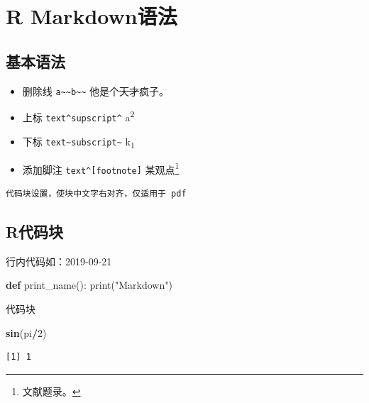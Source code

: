 \documentclass[]{article}
\newenvironment{Shaded}{\begin{snugshade}}{\end{snugshade}}
\newcommand{\BuiltInTok}[1]{#1}
\newcommand{\DecValTok}[1]{\textcolor[rgb]{0.00,0.00,0.81}{#1}}
\newcommand{\KeywordTok}[1]{\textcolor[rgb]{0.13,0.29,0.53}{\textbf{#1}}}
\newcommand{\NormalTok}[1]{#1}
\newcommand{\OperatorTok}[1]{\textcolor[rgb]{0.81,0.36,0.00}{\textbf{#1}}}
\newcommand{\StringTok}[1]{\textcolor[rgb]{0.31,0.60,0.02}{#1}}
\providecommand{\tightlist}{%
  \setlength{\itemsep}{0pt}\setlength{\parskip}{0pt}}
\let\rmarkdownfootnote\footnote%
\def\footnote{\protect\rmarkdownfootnote}
\begin{document}
\hypertarget{Rmarkdown}{%
\section{R Markdown语法}\label{Rmarkdown}}

\hypertarget{section-22}{%
\subsection{基本语法}\label{section-22}}

\begin{itemize}
\tightlist
\item
  删除线 \texttt{a\textasciitilde{}\textasciitilde{}b\textasciitilde{}\textasciitilde{}} 他是个\sout{天才}疯子。
\item
  上标 \texttt{text\^{}supscript\^{}} a\textsuperscript{2}
\item
  下标 \texttt{text\textasciitilde{}subscript\textasciitilde{}} k\textsubscript{1}
\item
  添加脚注 \texttt{text\^{}{[}footnote{]}} 某观点\footnote{文献题录。}
\end{itemize}

\begin{verbatim}
代码块设置，使块中文字右对齐，仅适用于 pdf
\end{verbatim}

\hypertarget{r}{%
\subsection{R代码块}\label{r}}

行内代码如：2019-09-21

\begin{Shaded}
\begin{Highlighting}[]
\KeywordTok{def}\NormalTok{ print_name():}
    \BuiltInTok{print}\NormalTok{(}\StringTok{"Markdown"}\NormalTok{)}
\end{Highlighting}
\end{Shaded}

代码块

\begin{Shaded}
\begin{Highlighting}[]
\KeywordTok{sin}\NormalTok{(pi}\OperatorTok{/}\DecValTok{2}\NormalTok{)}
\end{Highlighting}
\end{Shaded}

\begin{verbatim}
[1] 1
\end{verbatim}
\end{document}
